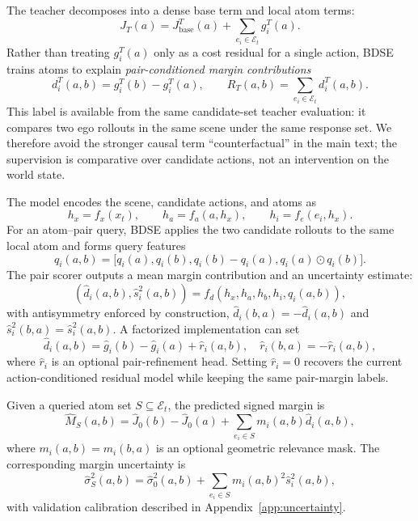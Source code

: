 \documentclass{article}
\newcommand{\E}{\mathcal{E}}
\begin{document}
The teacher decomposes into a dense base term and local atom terms:
\begin{equation}
    J_T(a)=J_{\mathrm{base}}^T(a)+\sum_{e_i\in\E_t}g_i^T(a).
    \label{eq:teacher_partition}
\end{equation}
Rather than treating $g_i^T(a)$ only as a cost residual for a single action, BDSE trains atoms to explain \emph{pair-conditioned margin contributions}
\begin{equation}
    d_i^T(a,b)=g_i^T(b)-g_i^T(a),\qquad
    R_T(a,b)=\sum_{e_i\in\E_t}d_i^T(a,b).
    \label{eq:atom_pair_margin_label}
\end{equation}
This label is available from the same candidate-set teacher evaluation: it compares two ego rollouts in the same scene under the same response set. We therefore avoid the stronger causal term ``counterfactual'' in the main text; the supervision is comparative over candidate actions, not an intervention on the world state.

The model encodes the scene, candidate actions, and atoms as
\begin{equation}
    h_x=f_x(x_t),\qquad h_a=f_a(a,h_x),\qquad h_i=f_e(e_i,h_x).
\end{equation}
For an atom--pair query, BDSE applies the two candidate rollouts to the same local atom and forms query features
\begin{equation}
    q_i(a,b)=\big[q_i(a),q_i(b),q_i(b)-q_i(a),q_i(a)\odot q_i(b)\big].
\end{equation}
The pair scorer outputs a mean margin contribution and an uncertainty estimate:
\begin{equation}
    (\hat d_i(a,b),\hat s_i^2(a,b))
    =f_d(h_x,h_a,h_b,h_i,q_i(a,b)),
    \label{eq:pair_atom_scorer}
\end{equation}
with antisymmetry enforced by construction, $\hat d_i(b,a)=-\hat d_i(a,b)$ and $\hat s_i^2(b,a)=\hat s_i^2(a,b)$. A factorized implementation can set
\begin{equation}
    \hat d_i(a,b)=\hat g_i(b)-\hat g_i(a)+\hat r_i(a,b),
    \quad \hat r_i(b,a)=-\hat r_i(a,b),
    \label{eq:factorized_pair_head}
\end{equation}
where $\hat r_i$ is an optional pair-refinement head. Setting $\hat r_i=0$ recovers the current action-conditioned residual model while keeping the same pair-margin labels.

Given a queried atom set $S\subseteq\E_t$, the predicted signed margin is
\begin{equation}
    \hat M_S(a,b)=\hat J_0(b)-\hat J_0(a)
    +\sum_{e_i\in S}m_i(a,b)\hat d_i(a,b),
    \label{eq:margin_decomp}
\end{equation}
where $m_i(a,b)=m_i(b,a)$ is an optional geometric relevance mask. The corresponding margin uncertainty is
\begin{equation}
    \hat\sigma_S^2(a,b)=\hat\sigma_0^2(a,b)+
    \sum_{e_i\in S}m_i(a,b)^2\hat s_i^2(a,b),
    \label{eq:margin_uncertainty}
\end{equation}
with validation calibration described in Appendix~\ref{app:uncertainty}.
\end{document}
